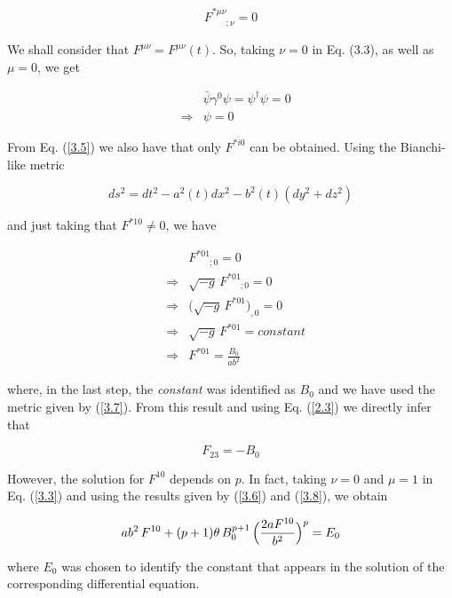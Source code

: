 \documentclass[a4paper,twocolumn,prd,superscriptaddress,nofootinbib,showpacs]
{revtex4}
\begin{document}
\begin{equation}
F^{\ast\mu\nu}_{\phantom{\ast\mu\nu};\nu}=0
\label{3.5}
\end{equation}

We shall consider that $F^{\mu\nu}=F^{\mu\nu}(t)$. So, taking $\nu=0$
in Eq. (3.3), as well as $\mu=0$, we get

\begin{eqnarray}
&&\bar\psi\gamma^0\psi=\psi^\dagger\psi=0
\nonumber\\
&\Rightarrow&\psi=0
\label{3.6}
\end{eqnarray}

\noindent
From Eq. (\ref{3.5}) we also have that only $F^{\ast i0}$ can be
obtained. Using the Bianchi-like metric

\begin{equation}
ds^2=dt^2-a^2(t)dx^2-b^2(t)(dy^2+dz^2)
\label{3.7}
\end{equation}

\noindent
and just taking that $F^{\ast10}\neq0$, we have

\begin{eqnarray}
&&F^{\ast01}_{\phantom{\ast01};0}=0
\nonumber\\
&\Rightarrow&\sqrt{-g}\,F^{\ast01}_{\phantom{\ast01};0}=0
\nonumber\\
&\Rightarrow&\bigl(\sqrt{-g}\,F^{\ast01}\bigr)_{,0}=0
\nonumber\\
&\Rightarrow&\sqrt{-g}\,F^{\ast01}=constant
\nonumber\\
&\Rightarrow&F^{\ast01}=\frac{B_0}{ab^2}
\label{3.8}
\end{eqnarray}

\noindent
where, in the last step, the {\it constant} was identified as $B_0$
and we have used the metric given by (\ref{3.7}). From this result and
using Eq. (\ref{2.3}) we directly infer that

\begin{equation}
F_{23}=-B_0
\label{3.9}
\end{equation}

\medskip
However, the solution for $F^{10}$ depends on $p$. In fact, taking
$\nu=0$ and $\mu=1$ in Eq. (\ref{3.3}) and using the results given by
(\ref{3.6}) and (\ref{3.8}), we obtain

\begin{equation}
ab^2\,F^{10}+(p+1)\theta\,B_0^{p+1}\,
\Bigl(\frac{2aF^{10}}{b^2}\Bigr)^p=E_0
\label{3.10}
\end{equation}

\noindent
where $E_0$ was chosen to identify the constant that appears in the
solution of the corresponding differential equation.
\end{document}
